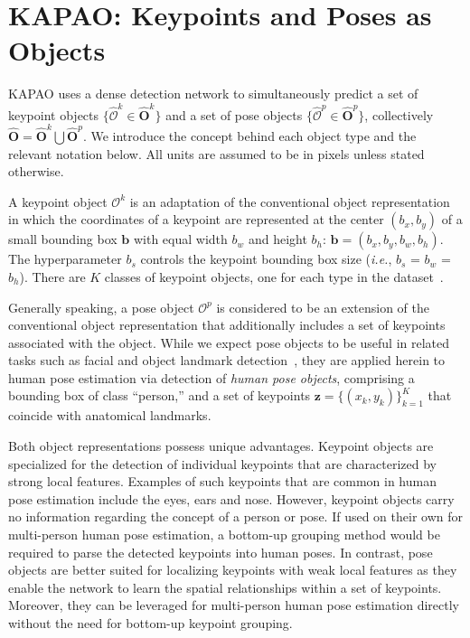 \documentclass[runningheads]{llncs}
\newcommand{\ie}{\textit{i.e.}}
\newcommand\hlll[1]{\bgroup
  \hskip0pt\color{black}#1\egroup
}
\begin{document}
\section{KAPAO: Keypoints and Poses as Objects}
KAPAO uses a dense detection network to simultaneously predict a set of keypoint objects $\{\hat{\mathcal{O}}^k\in\hat{\mathbf{O}}^k\}$ and a set of pose objects $\{\hat{\mathcal{O}}^p\in\hat{\mathbf{O}}^p\}$, collectively $\hat{\mathbf{O}} = \hat{\mathbf{O}}^k\bigcup\hat{\mathbf{O}}^p$. We introduce the concept behind each object type \hlll{and} the relevant notation below. All units are assumed to be in pixels unless stated otherwise.

A keypoint object $\mathcal{O}^k$ is an adaptation of the conventional object representation in which the coordinates of a keypoint are represented at the center $(b_x, b_y)$ of a small bounding box $\mathbf{b}$ with equal width $b_w$ and height $b_h$: $\mathbf{b} = (b_x, b_y, b_w, b_h)$. The hyperparameter $b_s$ controls the keypoint bounding box size (\ie, $b_s$ = $b_w$ = $b_h$). There are $K$ classes of keypoint objects, one for each type in the dataset~\cite{mcnally2021deepdarts}. 

Generally speaking, a pose object $\mathcal{O}^p$ is considered to be an extension of the conventional object representation that additionally includes a set of keypoints associated with the object. While we expect pose objects to be useful in related tasks such as facial and object landmark detection~\cite{xu2021anchorface,jeon2019joint}, they are applied herein to human pose estimation via detection of \textit{human pose objects}, comprising a bounding box of class ``person,'' and a set of keypoints $\mathbf{z} = \{(x_k, y_k)\}_{k=1}^K$ that coincide with anatomical landmarks.

Both object representations possess unique advantages. Keypoint objects are specialized for the detection of individual keypoints that are characterized by strong local features. Examples of such keypoints that are common in human pose estimation include the eyes, ears and nose. However, keypoint objects carry no information regarding the concept of a person or pose. If used on their own for multi-person human pose estimation, a bottom-up grouping method would be required to parse the detected keypoints into human poses. In contrast, pose objects are better suited for localizing keypoints with weak local features as they enable the network to learn the spatial relationships within a set of keypoints. Moreover, they can be leveraged for multi-person human pose estimation directly without the need for bottom-up keypoint grouping.
\end{document}
